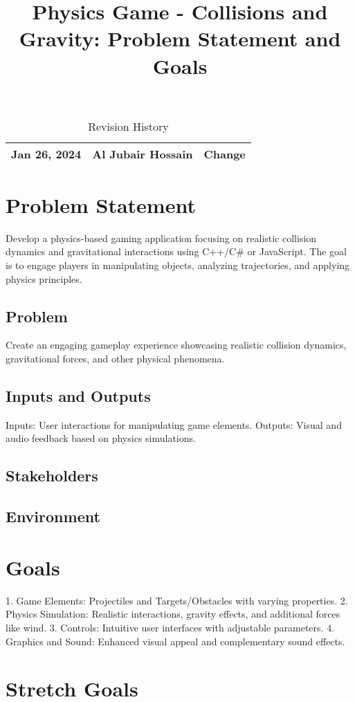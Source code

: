 \documentclass{article}
\title{Physics Game - Collisions and Gravity: Problem Statement and Goals}
\begin{document}
\maketitle

\begin{table}[hp]
\caption{Revision History} \label{TblRevisionHistory}
\begin{tabularx}{\textwidth}{llX}
\toprule
\textbf{Jan 26, 2024} & \textbf{Al Jubair Hossain} & \textbf{Change}\\
\midrule
\bottomrule
\end{tabularx}
\end{table}

\section{Problem Statement}
Develop a physics-based gaming application focusing on realistic collision dynamics and gravitational interactions using C++/C\# or JavaScript. The goal is to engage players in manipulating objects, analyzing trajectories, and applying physics principles.

\subsection{Problem}
Create an engaging gameplay experience showcasing realistic collision dynamics, gravitational forces, and other physical phenomena.

\subsection{Inputs and Outputs}
Inputs: User interactions for manipulating game elements.
Outputs: Visual and audio feedback based on physics simulations.

\subsection{Stakeholders}

\subsection{Environment}

\section{Goals}
1. Game Elements: Projectiles and Targets/Obstacles with varying properties.
2. Physics Simulation: Realistic interactions, gravity effects, and additional forces like wind.
3. Controls: Intuitive user interfaces with adjustable parameters.
4. Graphics and Sound: Enhanced visual appeal and complementary sound effects.

\section{Stretch Goals}
\end{document}
